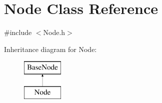 \hypertarget{class_node}{\section{Node Class Reference}
\label{class_node}
}


{\ttfamily \#include $<$Node.\-h$>$}

Inheritance diagram for Node\-:\begin{figure}[H]
\begin{center}
\leavevmode
\includegraphics[height=2.000000cm]{class_node}
\end{center}
\end{figure}
